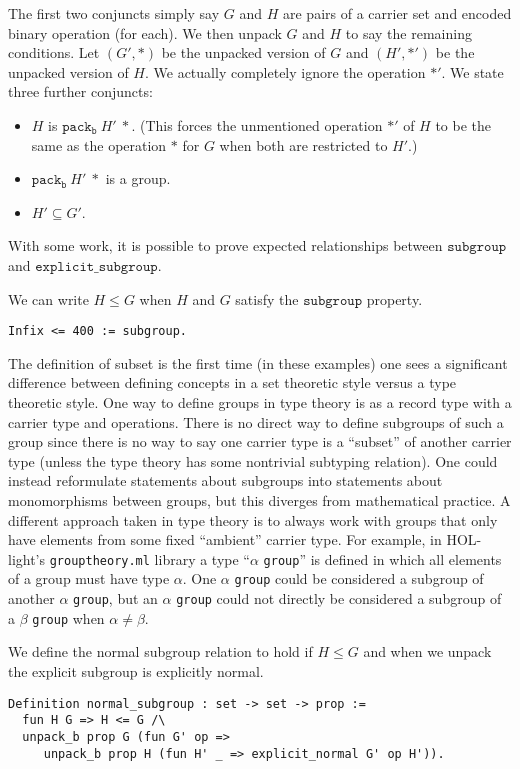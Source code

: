 \documentclass{article}
\begin{document}
The first two conjuncts simply say $G$ and $H$ are pairs of a carrier set and encoded binary operation (for each).
We then unpack $G$ and $H$ to say the remaining conditions.
Let $(G',*)$ be the unpacked version of $G$ and $(H',*')$ be the unpacked version of $H$.
We actually completely ignore the operation $*'$. We state three further conjuncts:
\begin{itemize}
\item $H$ is $\mathtt{pack_b}~H'~*$. (This forces the unmentioned operation $*'$ of $H$ to be the same as the operation $*$ for $G$ when both are restricted to $H'$.)
\item $\mathtt{pack_b}~H'~*$ is a group.
\item $H'\subseteq G'$.
\end{itemize}
With some work, it is possible to prove expected relationships between $\mathtt{subgroup}$ and $\mathtt{explicit\_subgroup}$.

We can write $H\leq G$ when $H$ and $G$ satisfy the $\mathtt{subgroup}$ property.
\begin{verbatim}
Infix <= 400 := subgroup.
\end{verbatim}

The definition of subset is the first time (in these examples) one
sees a significant difference between defining concepts in a set
theoretic style versus a type theoretic style.  One way to define
groups in type theory is as a record type with a carrier type and
operations.  There is no direct way to define subgroups of such a
group since there is no way to say one carrier type is a ``subset'' of
another carrier type (unless the type theory has some nontrivial
subtyping relation).  One could instead reformulate statements about
subgroups into statements about monomorphisms between groups, but this
diverges from mathematical practice.  A different approach taken in
type theory is to always work with groups that only have elements from
some fixed ``ambient'' carrier type.  For example, in HOL-light's
{\tt{grouptheory.ml}} library a type ``$\alpha$ {\tt{group}}'' is defined in which all
elements of a group must have type $\alpha$. One $\alpha$ {\tt{group}}
could be considered a subgroup of another $\alpha$ {\tt{group}},
but an $\alpha$ {\tt{group}}
could not directly be considered a subgroup of a $\beta$ {\tt{group}}
when $\alpha\not=\beta$.

We define the normal subgroup relation to hold if $H\leq G$ and when we unpack the explicit subgroup is
explicitly normal.
\begin{verbatim}
Definition normal_subgroup : set -> set -> prop :=
  fun H G => H <= G /\
  unpack_b prop G (fun G' op =>
     unpack_b prop H (fun H' _ => explicit_normal G' op H')).
\end{verbatim}
\end{document}

